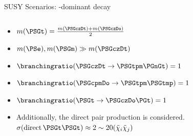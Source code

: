 \begin{frame}[fragile]{SUSY Scenarios: \PSGt-dominant decay}
  \begin{columns}
    \begin{column}{0.6\textwidth}
      \begin{itemize}
        \item \(m(\PSGt) = \frac{ m(\PSGczDt) + m(\PSGczDo) }{ 2 }\)
        \item \(m(\PSe), m(\PSGm) \gg m(\PSGczDt)\)
        \item \( \branchingratio( \PSGczDt \to \PSGtpm \PGnGt ) = 1 \)
        \item \( \branchingratio( \PSGcpmDo \to \PSGtpm \PSGtmp ) = 1 \)
        \item \( \branchingratio( \PSGt \to \PSGczDo \PGt ) = 1\)
        \item Additionally, the direct \PSGt pair production is considered. \(\sigma(\text{direct}\, \PSGt\PSGt) \approx 2\sim20(\tilde{\chi}_{i}\tilde{\chi}_{j})\)
      \end{itemize}
      

\end{column}
\end{columns}
\end{frame}
